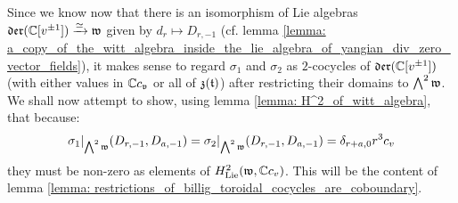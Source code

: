         Since we know now that there is an isomorphism of Lie algebras $\mathfrak{der}(\mathbb{C}[v^{\pm 1}]) \xrightarrow[]{\simeq} \mathfrak{w}$ given by $d_r \mapsto D_{r, -1}$ (cf. lemma \ref{lemma: a_copy_of_the_witt_algebra_inside_the_lie_algebra_of_yangian_div_zero_vector_fields}), it makes sense to regard $\sigma_1$ and $\sigma_2$ as $2$-cocycles of $\mathfrak{der}(\mathbb{C}[v^{\pm 1}])$ (with either values in $\mathbb{C} c_{\mathfrak{v}}$ or all of $\mathfrak{z}(\mathfrak{t})$) after restricting their domains to $\bigwedge^2 \mathfrak{w}$. We shall now attempt to show, using lemma \ref{lemma: H^2_of_witt_algebra}, that because:
            $$\sigma_1|_{\bigwedge^2 \mathfrak{w}}(D_{r, -1}, D_{a, -1}) = \sigma_2|_{\bigwedge^2 \mathfrak{w}}(D_{r, -1}, D_{a, -1}) = \delta_{r + a, 0} r^3 c_v$$
        they must be non-zero as elements of $H^2_{\mathrm{Lie}}(\mathfrak{w}, \mathbb{C} c_v)$. This will be the content of lemma \ref{lemma: restrictions_of_billig_toroidal_cocycles_are_coboundary}.

